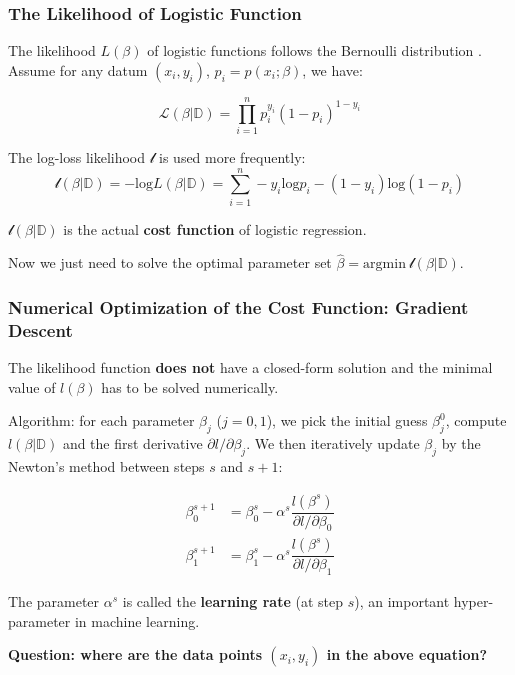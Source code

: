 \documentclass[10pt,aspectratio=169]{beamer}
\begin{document}
       \begin{frame}
         \frametitle{The Likelihood of Logistic Function}

         The likelihood $L(\beta)$ of logistic functions follows the
         Bernoulli distribution\let\thefootnote\relax%
         .%
         Assume for any datum 
         $(x_{i}, y_{i})$, $p_{i} = p(x_{i}; \beta)$, we have:

        \begin{equation*}
          \mathscr{L}(\beta|\mathbb{D}) = \prod_{i=1}^{n} p_{i}^{y_{i}} (1 - p_{i})^{1-y_{i}}
        \end{equation*}

        The log-loss likelihood $\mathscr{l}$ is used more frequently:
        \begin{equation*}
          \mathscr{l}(\beta|\mathbb{D}) = -\mathrm{log} L(\beta|\mathbb{D}) = \sum_{i=1}^{n} -y_{i} \mathrm{log}p_{i} -  (1 - y_{i}) \mathrm{log}(1 - p_{i})
        \end{equation*}
        
        
        $\mathscr{l}(\beta|\mathbb{D})$ is the actual \textbf{cost
          function} of logistic regression.  \vfill
        
        Now we just need to solve the optimal parameter set
        $\hat{\beta} = \mathrm{argmin}\
        \mathscr{l}(\beta|\mathbb{D})$.
        
      \end{frame}


      \begin{frame}
        \frametitle{Numerical Optimization of the Cost Function:
          Gradient Descent}
        The likelihood function \textbf{does not} have a closed-form
        solution and the minimal value of $l(\beta)$ has to be solved
        numerically.

        \vfill Algorithm: for each parameter $\beta_{j}$ ($j=0, 1$),
        we pick the initial guess $\beta_{j}^{0}$, compute
        $l(\beta|\mathbb{D})$ and the first derivative
        $\partial l/\partial \beta_{j}$. We then iteratively update
        $\beta_{j}$ by the Newton's method between steps $s$ and
        $s+1$:

        \begin{align*}
          \beta_{0}^{s+1} &= \beta_{0}^{s} - \alpha^{s} \dfrac{l(\beta^{s})}{\partial l/\partial \beta_{0}} \\
          \beta_{1}^{s+1} &= \beta_{1}^{s} - \alpha^{s} \dfrac{l(\beta^{s})}{\partial l/\partial \beta_{1}}
        \end{align*}

        The parameter $\alpha^{s}$ is called the \textbf{learning
          rate} (at step $s$), an important hyper-parameter in machine
        learning.

        \vfill
        \textbf{Question: where are the data points $(x_{i}, y_{i})$ in
        the above equation?}

      \end{frame}
\end{document}
